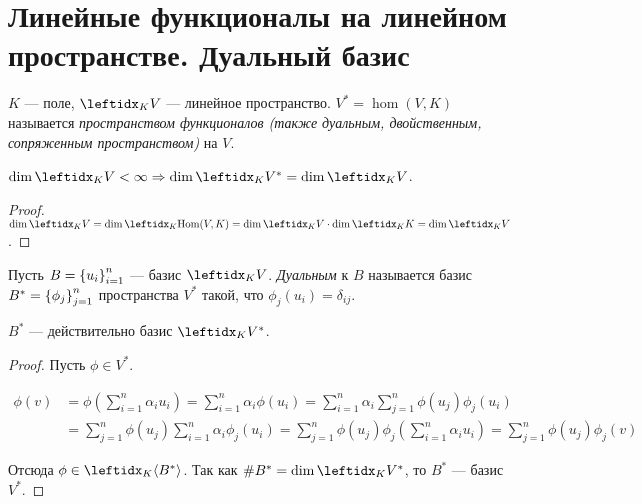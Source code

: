 \section{Линейные функционалы на линейном пространстве. Дуальный базис}

\begin{defn}
    $K$ --- поле, $\lsub{K}{V}$ --- линейное пространство. $V^* = \hom(V, K)$ называется \textit{пространством функционалов (также дуальным, двойственным, сопряженным пространством)} на $V$.
\end{defn}

\begin{thm}
    $\dim \lsub{K}{V} < \infty \Rightarrow \dim \lsub{K}{V^*} = \dim \lsub{K}{V}$.
\end{thm}

\begin{proof}
    $\dim \lsub{K}{V} = \dim \lsub{K}{\hom(V, K)} = \dim \lsub{K}{V} \cdot \dim \lsub{K}{K} = \dim \lsub{K}{V}$.
\end{proof}

\begin{defn}
    Пусть $B = \left\{u_i\right\}_{i=1}^{n}$ --- базис $\lsub{K}{V}$. \textit{Дуальным} к $B$ называется базис $B^* = \left\{\phi_j\right\}_{j=1}^{n}$ пространства $V^*$ такой, что $\phi_j(u_i) = \delta_{ij}$.
\end{defn}

\begin{thm}
    $B^*$ --- действительно базис $\lsub{K}{V^*}$.
\end{thm}

\begin{proof}
    Пусть $\phi \in V^*$.
    
    \begin{align*}
        \phi(v) &= \phi\left(\sum_{i=1}^n \alpha_i u_i\right) = \sum_{i=1}^n \alpha_i \phi(u_i) = \sum_{i=1}^n \alpha_i \sum_{j=1}^n \phi(u_j) \phi_j(u_i) \\
        &= \sum_{j=1}^n \phi(u_j) \sum_{i=1}^n \alpha_i \phi_j(u_i) = \sum_{j=1}^n \phi(u_j) \phi_j \left(\sum_{i=1}^n \alpha_i u_i \right) = \sum_{j=1}^n \phi(u_j) \phi_j(v)
    \end{align*}
    
    Отсюда $\phi \in \gen{K}{B^*}$. Так как $\#B^* = \dim \lsub{K}{V^*}$, то $B^*$ --- базис $V^*$.
\end{proof}